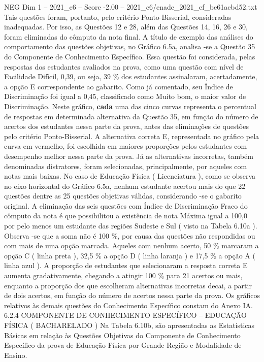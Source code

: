 \begin{textsample}{NEG Dim 1 – 2021\_c6 – Score -2.00 – 2021\_c6/enade\_2021\_ef\_be61acbd52.txt}
Tais questões foram, portanto, pelo critério Ponto-Bisserial, consideradas inadequadas.
Por isso, as Questões 12 e 28, além das Questões 14, 16, 26 e 30, foram eliminadas do cômputo da nota final.
A título de exemplo das análises do comportamento das questões objetivas, no Gráfico 6.5a, analisa -se a Questão 35 do Componente de Conhecimento Específico.
Essa questão foi considerada, pelas respostas dos estudantes avaliados na prova, como uma questão com nível de Facilidade Difícil, 0,39, ou seja, 39 \% dos estudantes assinalaram, acertadamente, a opção E correspondente ao gabarito.
Como já comentado, seu Índice de Discriminação foi igual a 0,45, classificado como Muito bom, o maior valor de Discriminação.
Neste gráfico, \textbf{cada} uma das cinco curvas representa o percentual de respostas em determinada alternativa da Questão 35, em função do número de acertos dos estudantes nessa parte da prova, antes das eliminações de questões pelo critério Ponto-Bisserial.
A alternativa correta E, representada no gráfico pela curva em vermelho, foi escolhida em maiores proporções pelos estudantes com desempenho melhor nessa parte da prova.
Já as alternativas incorretas, também denominadas distratores, foram selecionadas, principalmente, por aqueles com notas mais baixas.
No caso de Educação Física ( Licenciatura ), como se observa no eixo horizontal do Gráfico 6.5a, nenhum estudante acertou mais do que 22 questões dentre as 25 questões objetivas válidas, considerando -se o gabarito original.
A eliminação das seis questões com Índice de Discriminação Fraco do cômputo da nota é que possibilitou a existência de nota Máxima igual a 100,0 por pelo menos um estudante das regiões Sudeste e Sul ( visto na Tabela 6.10a ).
Observa -se que a soma não é 100 \%, por causa das questões não respondidas ou com mais de uma opção marcada.
Aqueles com nenhum acerto, 50 \% marcaram a opção C ( linha preta ), 32,5 \% a opção D ( linha laranja ) e 17,5 \% a opção A ( linha azul ).
A proporção de estudantes que selecionaram a resposta correta E aumenta gradativamente, chegando a atingir 100 \% para 21 acertos ou mais, enquanto a proporção dos que escolheram alternativas incorretas decai, a partir de dois acertos, em função do número de acertos nessa parte da prova.
Os gráficos relativos às demais questões do Conhecimento Específico constam do Anexo IA. 6.2.4 COMPONENTE DE CONHECIMENTO ESPECÍFICO – EDUCAÇÃO FÍSICA ( BACHARELADO ) Na Tabela 6.10b, são apresentadas as Estatísticas Básicas em relação às Questões Objetivas do Componente de Conhecimento Específico da prova de Educação Física por Grande Região e Modalidade de Ensino.

\end{textsample}
